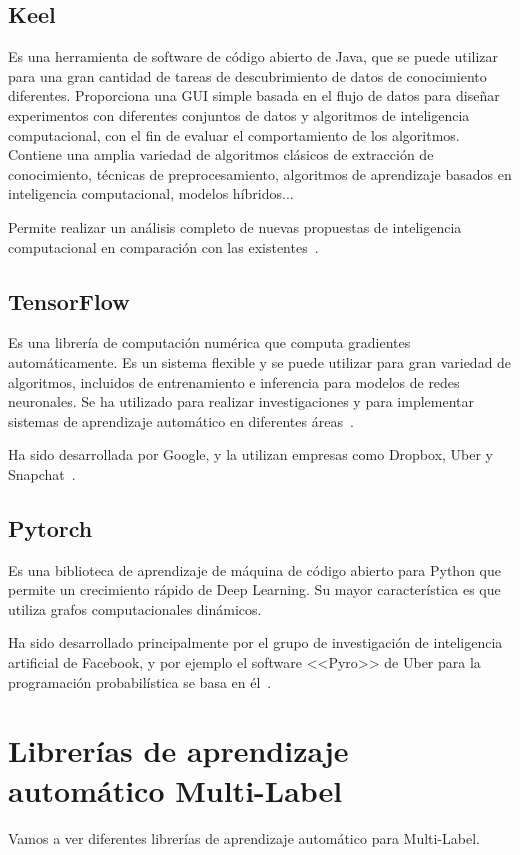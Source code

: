 \subsection{Keel}
Es una herramienta de software de código abierto de Java, que se puede utilizar para una gran cantidad de tareas de descubrimiento de datos de conocimiento diferentes. Proporciona una GUI simple basada en el flujo de datos para diseñar experimentos con diferentes conjuntos de datos y algoritmos de inteligencia computacional, con el fin de evaluar el comportamiento de los algoritmos. Contiene una amplia variedad de algoritmos clásicos de extracción de conocimiento, técnicas de preprocesamiento, algoritmos de aprendizaje basados en inteligencia computacional, modelos híbridos...

Permite realizar un análisis completo de nuevas propuestas de inteligencia computacional en comparación con las existentes~\cite{keel}.

\subsection{TensorFlow}
Es una librería de computación numérica que computa gradientes automáticamente. Es un sistema flexible y se puede utilizar para gran variedad de algoritmos, incluidos de entrenamiento e inferencia para modelos de redes neuronales. Se ha utilizado para realizar investigaciones y para implementar sistemas de aprendizaje automático en diferentes áreas~\cite{tensorflow}.

Ha sido desarrollada por Google, y la utilizan empresas como Dropbox, Uber y Snapchat~\cite{libraries}.

\subsection{Pytorch}
Es una biblioteca de aprendizaje de máquina de código abierto para Python que permite un crecimiento rápido de Deep Learning. Su mayor característica es que utiliza grafos computacionales dinámicos.

Ha sido desarrollado principalmente por el grupo de investigación de inteligencia artificial de Facebook, y por ejemplo el software <<Pyro>> de Uber para la programación probabilística se basa en él~\cite{wiki:pytorch}.

\section{Librerías de aprendizaje automático Multi-Label}
Vamos a ver diferentes librerías de aprendizaje automático para Multi-Label.
